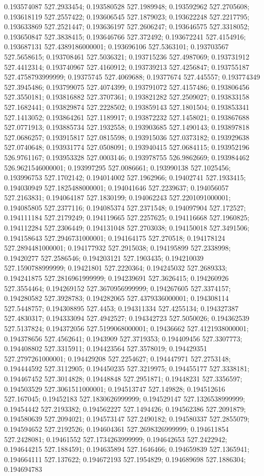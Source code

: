 0.193574087 527.2933454; 0.193580528 527.1989948; 0.193592962 527.2705608; 0.193618119 527.2557422; 0.193606545 527.1879023; 0.193622248 527.2217795; 0.193633869 527.2521447; 0.193636197 527.2606247; 0.193646575 527.3318052; 0.193650847 527.3838415; 0.193646766 527.372492; 0.193672241 527.4154916; 0.193687131 527.4389186000001; 0.193696106 527.5363101; 0.193703567 527.5658615; 0.193708461 527.5036321; 0.193715236 527.4987069; 0.193731912 527.4412314; 0.193740967 527.4160912; 0.193739213 527.4256847; 0.193755187 527.4758793999999; 0.19375745 527.4069688; 0.19377674 527.445557; 0.193774349 527.3945486; 0.193799075 527.4074399; 0.193791072 527.4157486; 0.193806456 527.3550181; 0.193816882 527.3707361; 0.193821282 527.2509027; 0.193833158 527.1682441; 0.193829874 527.2228502; 0.193859143 527.1801504; 0.193853341 527.1413052; 0.193864261 527.1189917; 0.193872232 527.1458021; 0.193867688 527.0771913; 0.193885734 527.1932558; 0.193903685 527.1490143; 0.193897818 527.0686257; 0.193915817 527.0815598; 0.193915036 527.0373182; 0.193929638 527.0740648; 0.193931774 527.0508091; 0.193940415 527.0684115; 0.193952196 526.9761167; 0.193953328 527.0003146; 0.193978755 526.9862669; 0.193984462 526.9621546000001; 0.193997295 527.0086661; 0.193990138 527.1025456; 0.193996753 527.1702142; 0.194014002 527.1962966; 0.19402741 527.1933415; 0.194030949 527.1825488000001; 0.194041646 527.2239637; 0.194056057 527.2163831; 0.194064187 527.1830199; 0.194062243 527.2201091000001; 0.194085805 527.2377116; 0.194085374 527.2371548; 0.194097904 527.172527; 0.194111184 527.2179249; 0.194119665 527.2257625; 0.194116668 527.1960825; 0.194112284 527.2306449; 0.194131048 527.2703038; 0.194150018 527.3491506; 0.194158643 527.2946731000001; 0.194164175 527.270518; 0.194178124 527.2894481000001; 0.194177932 527.2915038; 0.194195899 527.2338998; 0.19420277 527.2586546; 0.194203121 527.1903435; 0.194210039 527.1590788999999; 0.19421801 527.2220364; 0.194245032 527.2689333; 0.194241875 527.2816961999999; 0.194239691 527.3626415; 0.194260926 527.3554464; 0.194269152 527.3670956999999; 0.194267605 527.3374157; 0.194280582 527.3928783; 0.194282065 527.4379336000001; 0.194308114 527.5448757; 0.194308895 527.4453; 0.194311334 527.4255134; 0.194327387 527.4830317; 0.194333094 527.4942527; 0.194342723 527.5050026; 0.194362539 527.5137824; 0.194372056 527.5199068000001; 0.19436662 527.4121938000001; 0.194378656 527.4562641; 0.1943909 527.3719353; 0.194409456 527.3307773; 0.194408802 527.3315911; 0.194423564 527.3578019; 0.194429351 527.2797261000001; 0.194429208 527.2254627; 0.194447971 527.2753148; 0.194444592 527.3112905; 0.194450235 527.3219975; 0.194455177 527.3338181; 0.194467452 527.3014828; 0.19448848 527.2951871; 0.19448231 527.3356597; 0.194503529 527.3061511000001; 0.194513747 527.149828; 0.194512616 527.167045; 0.19452183 527.1830626999999; 0.194529147 527.1326538999999; 0.19454442 527.2193382; 0.194562227 527.1494426; 0.194562386 527.2091879; 0.194580639 527.2094021; 0.194573147 527.2490182; 0.194580337 527.2855079; 0.194594652 527.2192526; 0.194604361 527.2698326999999; 0.194611854 527.2428081; 0.19461552 527.1734263999999; 0.194642653 527.2422942; 0.194644215 527.1884591; 0.194635894 527.1646466; 0.194659839 527.1365941; 0.194664111 527.137622; 0.194672193 527.1954829; 0.194689698 527.1886304; 0.194694783 